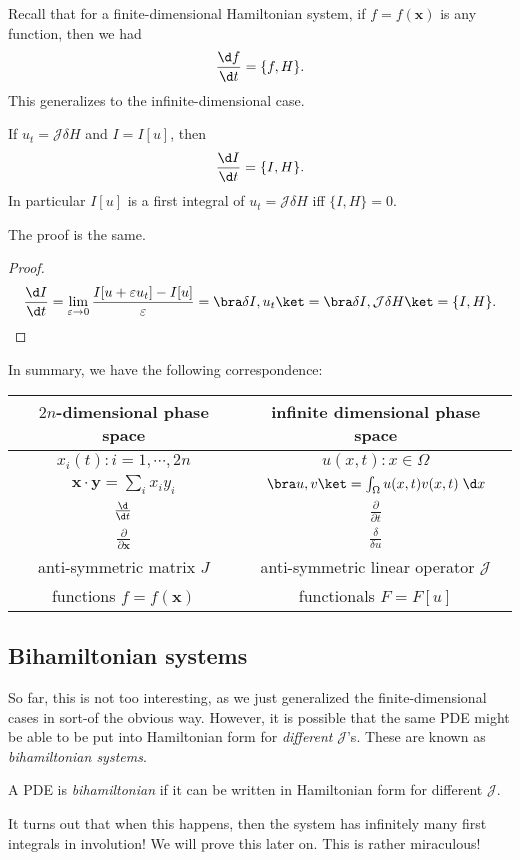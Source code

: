 \documentclass[a4paper]{article}
\begin{document}
Recall that for a finite-dimensional Hamiltonian system, if $f = f(\mathbf{x})$ is any function, then we had
\[
  \frac{\d f}{\d t} = \{f, H\}.
\]
This generalizes to the infinite-dimensional case.
\begin{prop}
  If $u_t = \mathcal{J} \delta H$ and $I = I[u]$, then
  \[
    \frac{\d I}{\d t} = \{I, H\}.
  \]
  In particular $I[u]$ is a first integral of $u_t = \mathcal{J} \delta H$ iff $\{I, H\} = 0$.
\end{prop}

The proof is the same.
\begin{proof}
  \[
    \frac{\d I}{\d t} = \lim_{\varepsilon \to 0} \frac{I[u + \varepsilon u_t] - I[u]}{\varepsilon} = \bra \delta I, u_t\ket = \bra \delta I, \mathcal{J}\delta H\ket = \{I, H\}.
  \]
\end{proof}

In summary, we have the following correspondence:
\begin{center}
  \begin{tabular}{cc}
    \toprule
    $2n$-dimensional phase space & infinite dimensional phase space\\
    \midrule
    $x_i(t): i = 1, \cdots, 2n$ & $u(x, t): x \in \Omega$\\
    $\mathbf{x}\cdot\mathbf{y} = \sum_i x_i y_i$ & $\bra u, v \ket = \int_\Omega u(x, t) v(x, t) \;\d x$\\
    $\frac{\d}{\d t}$ & $\frac{\partial}{\partial t}$\\
    $\frac{\partial}{\partial \mathbf{x}}$ & $\frac{\delta}{\delta u}$\\
    anti-symmetric matrix $J$ & anti-symmetric linear operator $\mathcal{J}$ \\
    functions $f = f(\mathbf{x})$ & functionals $F = F[u]$\\
    \bottomrule
  \end{tabular}
\end{center}


\subsection{Bihamiltonian systems}
So far, this is not too interesting, as we just generalized the finite-dimensional cases in sort-of the obvious way. However, it is possible that the same PDE might be able to be put into Hamiltonian form for \emph{different} $\mathcal{J}$'s. These are known as \emph{bihamiltonian systems}.
\begin{defi}
  A PDE is \emph{bihamiltonian} if it can be written in Hamiltonian form for different $\mathcal{J}$.
\end{defi}
It turns out that when this happens, then the system has infinitely many first integrals in involution! We will prove this later on. This is rather miraculous!
\end{document}
